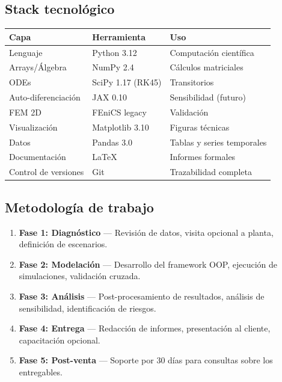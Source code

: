 \documentclass[11pt,a4paper]{article}
\begin{document}
\subsection{Stack tecnológico}

\begin{table}[H]
\centering
\begin{tabular}{@{}lll@{}}
\toprule
\textbf{Capa} & \textbf{Herramienta} & \textbf{Uso} \\
\midrule
Lenguaje & Python 3.12 & Computación científica \\
Arrays/Álgebra & NumPy 2.4 & Cálculos matriciales \\
ODEs & SciPy 1.17 (RK45) & Transitorios \\
Auto-diferenciación & JAX 0.10 & Sensibilidad (futuro) \\
FEM 2D & FEniCS legacy & Validación \\
Visualización & Matplotlib 3.10 & Figuras técnicas \\
Datos & Pandas 3.0 & Tablas y series temporales \\
Documentación & LaTeX & Informes formales \\
Control de versiones & Git & Trazabilidad completa \\
\bottomrule
\end{tabular}
\end{table}

\subsection{Metodología de trabajo}

\begin{enumerate}
  \item \textbf{Fase 1: Diagnóstico} — Revisión de datos, visita opcional a planta, definición de escenarios.
  \item \textbf{Fase 2: Modelación} — Desarrollo del framework OOP, ejecución de simulaciones, validación cruzada.
  \item \textbf{Fase 3: Análisis} — Post-procesamiento de resultados, análisis de sensibilidad, identificación de riesgos.
  \item \textbf{Fase 4: Entrega} — Redacción de informes, presentación al cliente, capacitación opcional.
  \item \textbf{Fase 5: Post-venta} — Soporte por 30 días para consultas sobre los entregables.
\end{enumerate}

\newpage
\end{document}

